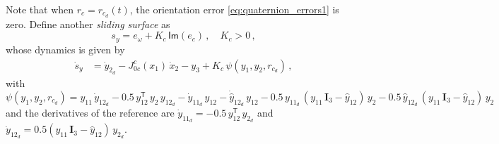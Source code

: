 Note that when $r_{c} = r_{c_d}(t)$, the orientation error \eqref{eq:quaternion_errors1} is zero.
%
Define another \textit{sliding surface} as
%
\begin{equation}
s_{y} = e_{\omega} + K_{c} \, \mathsf{Im}(e_{c}) \,, \quad K_{c} > 0 \,,
\label{eq:quaternion_sliding_surface}
\end{equation}
%
whose dynamics is given by
%
%
\begin{align}
\dot{s}_{y} &= \dot{y}_{2_d} - J^{c}_{0c}(x_1) \, \dot{x}_2 - y_3 + K_{c} \, \psi(y_1,y_2,r_{c_d}) \,, \label{eq:quaternion_sliding_dynamics2}
\end{align}
%
with $\psi(y_1,y_2,r_{c_d}) = y_{11} \, \dot{y}_{12_d} - 0.5 \, y^\mathsf{T}_{12} \, y_{2} \, y_{12_d} - \dot{y}_{11_d} \, y_{12} - \dot{\widehat{y}}_{12_d} \, y_{12} - 0.5 \, y_{11_d} \, ( y_{11} \, \mathbf{I}_{3} - \widehat{y}_{12} ) \, y_{2} - 0.5 \, \widehat{y}_{12_d} \, ( y_{11} \, \mathbf{I}_{3} - \widehat{y}_{12} ) \, y_{2}$ 
and the derivatives of the reference are 
$\dot{y}_{11_d} = -0.5 \, y^\mathsf{T}_{12} \, y_{2_d}$ 
and 
$\dot{y}_{12_d} = 0.5 ( y_{11} \, \mathbf{I}_{3} - \widehat{y}_{12} ) \, y_{2_d}$.
%

